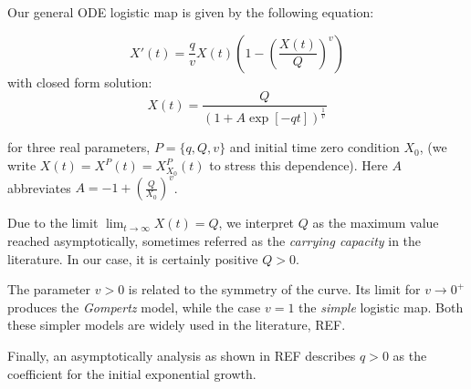 \documentclass[8pt]{article}
\begin{document}
Our general ODE logistic map is given by the following equation:

\begin{equation}
	X'(t) = \frac{q}{v} X(t) 
	\left ( 1 - \left( \frac{X(t)}{Q} \right)^{v}\right )
\end{equation}
with closed form solution:
\begin{equation}
	X(t) = \frac{Q} { (1 + A \exp[-q t])^{\frac{1}{v}}}
\end{equation}

for three real parameters, 
$P = \{ q, Q, v\}$ and initial time zero condition $X_0$,
(we write $X(t) = X^P(t) = X^P_{X_0}(t)$ to stress this dependence).
Here $A$ abbreviates 
$A = -1 + \left ( \frac{Q} { X_0} \right )^{v}$.


Due to the limit $\lim_{t \to \infty} X(t) = Q$, 
we interpret $Q$ as
the maximum value reached asymptotically, sometimes
referred as the \emph{carrying capacity} in the literature.
In our case, it is certainly positive $Q > 0$.


The parameter $v > 0$ is related to the symmetry of the curve.
Its limit for $v \to 0^+$ produces the \emph{Gompertz} model,
while the case $v = 1$ the \emph{simple} logistic map.
Both these simpler models are widely used in the literature, REF.


Finally, an asymptotically analysis as shown in REF 
describes $q > 0$ as the coefficient for the initial exponential 
growth.
\end{document}
